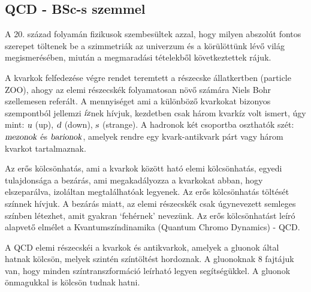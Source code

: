\documentclass[a4paper,12pt]{article}
\begin{document}
\subsection{ QCD - BSc-s szemmel}
\vspace{5mm}
\par A 20. század folyamán fizikusok szembesültek azzal, hogy milyen abszolút fontos szerepet töltenek be a szimmetriák az univerzum és a körülöttünk lévő világ
 megismerésében, miután a megmaradási tételekből következtettek rájuk.
\vspace{5mm}
\par A kvarkok felfedezése végre rendet teremtett a részecske állatkertben (particle ZOO), ahogy az elemi részecskék folyamatosan növő számára Niels Bohr szellemesen referált.
 A mennyiséget ami a különböző kvarkokat bizonyos szempontból jellemzi $\textsl{íz}$nek hívjuk, kezdetben
csak három kvarkíz volt ismert, úgy mint: $\textsl{u}$ (up), $\textsl{d}$ (down), $\textsl{s}$ (strange).
 A hadronok két csoportba oszthatók szét: $\textsl{mezonok}$ és $\textsl{barionok}$, amelyek rendre 
 egy kvark-antikvark párt vagy három kvarkot tartalmaznak.
\vspace{5mm}
\par Az erős kölcsönhatás, ami a kvarkok között ható elemi kölcsönhatás, egyedi tulajdonsága a bezárás, ami megakadályozza a kvarkokat abban, hogy elszeparálva,
 izoláltan megtalálhatóak legyenek. Az erős kölcsönhatás töltését színnek hívjuk. A bezárás miatt, az elemi részecskék csak úgynevezett semleges színben létezhet, amit gyakran `fehérnek' nevezünk. 
Az erős kölcsönhatást leíró alapvető elmélet a Kvantumszíndinamika (Quantum Chromo Dynamics) - QCD.
\vspace{5mm}
\par A QCD elemi részecskéi a kvarkok és antikvarkok, amelyek a gluonok által hatnak kölcsön, melyek szintén
 színtöltést hordoznak. A gluonoknak 8 fajtájuk van, hogy minden színtranszformáció leírható legyen segítségükkel. A gluonok önmagukkal is kölcsön tudnak hatni.
\end{document}
